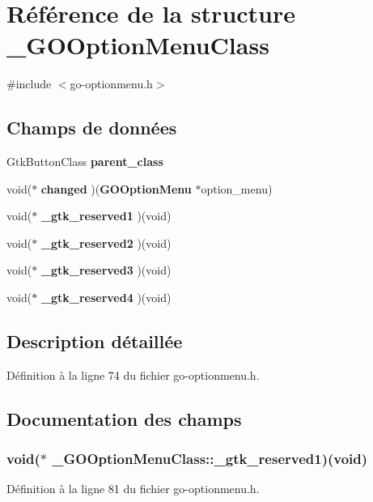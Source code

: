 \section{Référence de la structure \_\-GOOptionMenuClass}
\label{struct__GOOptionMenuClass}


{\ttfamily \#include $<$go-\/optionmenu.h$>$}

\subsection*{Champs de données}
\begin{DoxyCompactItemize}
\item 
GtkButtonClass {\bf parent\_\-class}
\item 
void($\ast$ {\bf changed} )({\bf GOOptionMenu} $\ast$option\_\-menu)
\item 
void($\ast$ {\bf \_\-gtk\_\-reserved1} )(void)
\item 
void($\ast$ {\bf \_\-gtk\_\-reserved2} )(void)
\item 
void($\ast$ {\bf \_\-gtk\_\-reserved3} )(void)
\item 
void($\ast$ {\bf \_\-gtk\_\-reserved4} )(void)
\end{DoxyCompactItemize}


\subsection{Description détaillée}


Définition à la ligne 74 du fichier go-\/optionmenu.h.



\subsection{Documentation des champs}
\subsubsection[{\_\-gtk\_\-reserved1}]{\setlength{\rightskip}{0pt plus 5cm}void($\ast$ {\bf \_\-GOOptionMenuClass::\_\-gtk\_\-reserved1})(void)}\label{struct__GOOptionMenuClass_a7108808eca985cc8e74f55b86ac03427}


Définition à la ligne 81 du fichier go-\/optionmenu.h.

